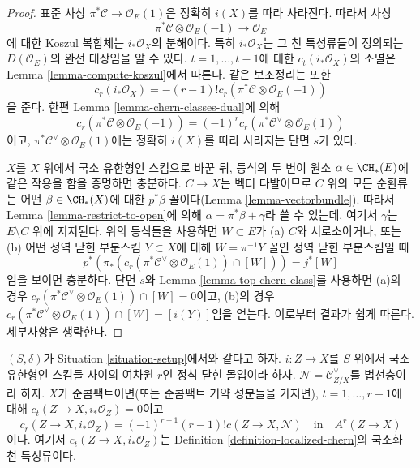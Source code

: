 \begin{proof}
표준 사상 $\pi^*\mathcal{C} \to \mathcal{O}_E(1)$은 정확히 $i(X)$를
따라 사라진다. 따라서 사상
$$
\pi^*\mathcal{C} \otimes \mathcal{O}_E(-1) \to \mathcal{O}_E
$$
에 대한 Koszul 복합체는 $i_*\mathcal{O}_X$의 분해이다. 특히
$i_*\mathcal{O}_X$는 그 천 특성류들이 정의되는
$D(\mathcal{O}_E)$의 완전 대상임을 알 수 있다.
$t = 1, \ldots, t - 1$에 대한 $c_t(i_*\mathcal{O}_X)$의 소멸은
Lemma \ref{lemma-compute-koszul}에서 따른다. 같은 보조정리는 또한
$$
c_r(i_*\mathcal{O}_X) = - (r - 1)!
c_r(\pi^*\mathcal{C} \otimes \mathcal{O}_E(-1))
$$
을 준다. 한편 Lemma \ref{lemma-chern-classes-dual}에 의해
$$
c_r(\pi^*\mathcal{C} \otimes \mathcal{O}_E(-1)) =
(-1)^r c_r(\pi^*\mathcal{C}^\vee \otimes \mathcal{O}_E(1))
$$
이고, $\pi^*\mathcal{C}^\vee \otimes \mathcal{O}_E(1)$에는 정확히
$i(X)$를 따라 사라지는 단면 $s$가 있다.

\medskip\noindent
$X$를 $X$ 위에서 국소 유한형인 스킴으로 바꾼 뒤, 등식의 두 변이
원소 $\alpha \in \CH_*(E)$에 같은 작용을 함을 증명하면 충분하다.
$C \to X$는 벡터 다발이므로 $C$ 위의 모든 순환류는 어떤
$\beta \in \CH_*(X)$에 대한 $p^*\beta$ 꼴이다(Lemma
\ref{lemma-vectorbundle}). 따라서 Lemma \ref{lemma-restrict-to-open}에
의해 $\alpha = \pi^*\beta + \gamma$라 쓸 수 있는데, 여기서
$\gamma$는 $E \setminus C$ 위에 지지된다. 위의 등식들을 사용하면
$W \subset E$가 (a) $C$와 서로소이거나, 또는 (b) 어떤 정역 닫힌
부분스킴 $Y \subset X$에 대해 $W = \pi^{-1}Y$ 꼴인 정역 닫힌
부분스킴일 때
$$
p^*(\pi_*(c_r(\pi^*\mathcal{C}^\vee \otimes \mathcal{O}_E(1)) \cap [W])) =
j^*[W]
$$
임을 보이면 충분하다. 단면 $s$와 Lemma
\ref{lemma-top-chern-class}를 사용하면 (a)의 경우
$c_r(\pi^*\mathcal{C}^\vee \otimes \mathcal{O}_E(1)) \cap [W] = 0$이고,
(b)의 경우
$c_r(\pi^*\mathcal{C}^\vee \otimes \mathcal{O}_E(1)) \cap [W] = [i(Y)]$임을
얻는다. 이로부터 결과가 쉽게 따른다. 세부사항은 생략한다.
\end{proof}

\begin{lemma}
\label{lemma-agreement-with-loc-chern}
$(S, \delta)$가 Situation \ref{situation-setup}에서와 같다고 하자.
$i : Z \to X$를 $S$ 위에서 국소 유한형인 스킴들 사이의 여차원
$r$인 정칙 닫힌 몰입이라 하자. $\mathcal{N} = \mathcal{C}_{Z/X}^\vee$를
법선층이라 하자. $X$가 준콤팩트이면(또는 준콤팩트 기약 성분들을
가지면), $t = 1, \ldots, r - 1$에 대해
$c_t(Z \to X, i_*\mathcal{O}_Z) = 0$이고
$$
c_r(Z \to X, i_*\mathcal{O}_Z) = (-1)^{r - 1} (r - 1)! c(Z \to X, \mathcal{N})
\quad\text{in}\quad
A^r(Z \to X)
$$
이다. 여기서 $c_t(Z \to X, i_*\mathcal{O}_Z)$는 Definition
\ref{definition-localized-chern}의 국소화 천 특성류이다.
\end{lemma}

